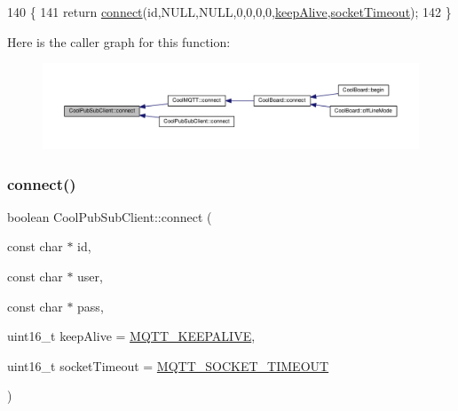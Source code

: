 \begin{DoxyCode}
140                                                                                             \{
141     \textcolor{keywordflow}{return} \hyperlink{class_cool_pub_sub_client_a2664c2ebc302b2fa49f493a339ecc891}{connect}(\textcolor{keywordtype}{id},NULL,NULL,0,0,0,0,\hyperlink{class_cool_pub_sub_client_a653f086eb3a039c08116bb828e35f7c1}{keepAlive},\hyperlink{class_cool_pub_sub_client_a2d7b7c7dda1313ff1492b158c3712630}{socketTimeout});
142  \}
\end{DoxyCode}
Here is the caller graph for this function\+:\nopagebreak
\begin{figure}[H]
\begin{center}
\leavevmode
\includegraphics[width=350pt]{d8/d4b/class_cool_pub_sub_client_a2664c2ebc302b2fa49f493a339ecc891_icgraph}
\end{center}
\end{figure}
\mbox{\label{class_cool_pub_sub_client_a7f30e39bf4ca5ea5fb9747c403639a03}} 
\subsubsection{\texorpdfstring{connect()}{connect()}\hspace{0.1cm}{\footnotesize\ttfamily [2/4]}}
{\footnotesize\ttfamily boolean Cool\+Pub\+Sub\+Client\+::connect (\begin{DoxyParamCaption}\item[{const char $\ast$}]{id,  }\item[{const char $\ast$}]{user,  }\item[{const char $\ast$}]{pass,  }\item[{uint16\+\_\+t}]{keep\+Alive = {\ttfamily \hyperlink{_cool_pub_sub_client_8h_afb4dd8c75385ab30e659314df7c2c335}{M\+Q\+T\+T\+\_\+\+K\+E\+E\+P\+A\+L\+I\+VE}},  }\item[{uint16\+\_\+t}]{socket\+Timeout = {\ttfamily \hyperlink{_cool_pub_sub_client_8h_a092cc564e4d7f03fdab6137e30a7f05b}{M\+Q\+T\+T\+\_\+\+S\+O\+C\+K\+E\+T\+\_\+\+T\+I\+M\+E\+O\+UT}} }\end{DoxyParamCaption})}



